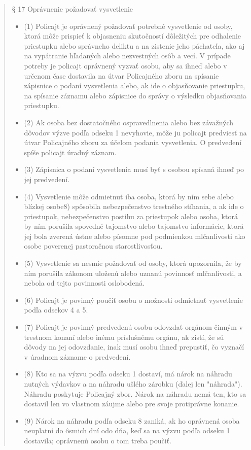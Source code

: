 \documentclass[openany]{book}
\begin{document}
\begin{quote}
§ 17 
Oprávnenie požadovať vysvetlenie
\begin{itemize}
\item[] (1) Policajt je oprávnený požadovať potrebné vysvetlenie od osoby, ktorá môže prispieť k objasneniu skutočností dôležitých pre odhalenie priestupku alebo správneho deliktu a na zistenie jeho páchateľa, ako aj na vypátranie hľadaných alebo nezvestných osôb a vecí. V prípade potreby je policajt oprávnený vyzvať osobu, aby sa ihneď alebo v určenom čase dostavila na útvar Policajného zboru na spísanie zápisnice o podaní vysvetlenia alebo, ak ide o objasňovanie priestupku, na spísanie záznamu alebo zápisnice do správy o výsledku objasňovania priestupku. 

\item[] (2) Ak osoba bez dostatočného ospravedlnenia alebo bez závažných dôvodov výzve podľa odseku 1 nevyhovie, môže ju policajt predviesť na útvar Policajného zboru za účelom podania vysvetlenia. O predvedení spíše policajt úradný záznam. 

\item[] (3) Zápisnica o podaní vysvetlenia musí byť s osobou spísaná ihneď po jej predvedení. 

\item[] (4) Vysvetlenie môže odmietnuť iba osoba, ktorá by ním sebe alebo blízkej osobe8) spôsobila nebezpečenstvo trestného stíhania, a ak ide o priestupok, nebezpečenstvo postihu za priestupok alebo osoba, ktorá by ním porušila spovedné tajomstvo alebo tajomstvo informácie, ktorá jej bola zverená ústne alebo písomne pod podmienkou mlčanlivosti ako osobe poverenej pastoračnou starostlivosťou. 

\item[] (5) Vysvetlenie sa nesmie požadovať od osoby, ktorá upozornila, že by ním porušila zákonom uloženú alebo uznanú povinnosť mlčanlivosti, a nebola od tejto povinnosti oslobodená. 

\item[] (6) Policajt je povinný poučiť osobu o možnosti odmietnuť vysvetlenie podľa odsekov 4 a 5. 

\item[] (7) Policajt je povinný predvedenú osobu odovzdať orgánom činným v trestnom konaní alebo inému príslušnému orgánu, ak zistí, že sú dôvody na jej odovzdanie, inak musí osobu ihneď prepustiť, čo vyznačí v úradnom zázname o predvedení. 

\item[] (8) Kto sa na výzvu podľa odseku 1 dostaví, má nárok na náhradu nutných výdavkov a na náhradu ušlého zárobku (ďalej len "náhrada"). Náhradu poskytuje Policajný zbor. Nárok na náhradu nemá ten, kto sa dostavil len vo vlastnom záujme alebo pre svoje protiprávne konanie. 

\item[] (9) Nárok na náhradu podľa odseku 8 zaniká, ak ho oprávnená osoba neuplatní do ôsmich dní odo dňa, keď sa na výzvu podľa odseku 1 dostavila; oprávnenú osobu o tom treba poučiť. 
\end{itemize}
\end{quote}
\end{document}
